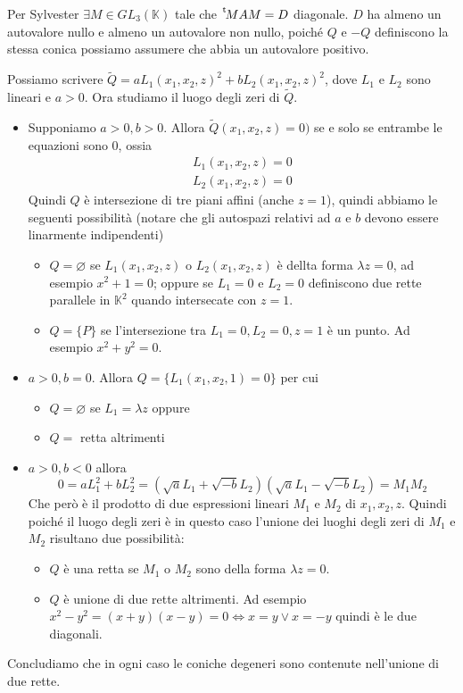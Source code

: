 \documentclass{article}
\newcommand*{\transp}[2][-3mu]{\ensuremath{\mskip1mu\prescript{\smash{\mathrm t\mkern#1}}{}{\mathstrut#2}}}%
\theoremstyle{plain}
\theoremstyle{definition}
\theoremstyle{remark}
\begin{document}
Per Sylvester \(\exists M \in GL_3(\mathbb{K})\) tale che \(\transp{M} A M = D\)
diagonale. \(D\) ha almeno un autovalore nullo e almeno un autovalore non nullo,
poiché \(Q\) e \(-Q\) definiscono la stessa conica possiamo assumere che abbia
un autovalore positivo.

Possiamo scrivere \(\widetilde Q = aL_{1}(x_{1}, x_{2}, z)^2 + bL_{2}(x_{1}, x_{2},
z)^2\), dove \(L_{1}\) e \(L_{2}\) sono lineari e \(a > 0\). Ora studiamo il
luogo degli zeri di \(\widetilde{Q}\).
\begin{itemize}[label = --]
    \item Supponiamo \(a > 0, b > 0\). Allora \(\widetilde{Q}(x_{1}, x_{2}, z) =
        0)\) se e solo se entrambe le equazioni sono \(0\), ossia
        \begin{align*}
            L_{1}(x_{1}, x_{2}, z) = 0 \\
            L_{2}(x_{1}, x_{2}, z) = 0
        \end{align*}
        Quindi \(Q\) è intersezione di tre piani affini (anche \(z = 1\)), quindi abbiamo le
        seguenti possibilità (notare che gli autospazi relativi ad \(a\) e \(b\)
        devono essere linarmente indipendenti)
\begin{itemize}[label = --]
    \item \(Q = \varnothing\) se \(L_{1}(x_{1}, x_{2}, z)\) o \(L_{2}(x_{1},
        x_{2}, z)\) è dellta forma \(\lambda z = 0\), ad esempio \(x^2 + 1 =
        0\); oppure se \(L_{1} = 0\) e \(L_{2}= 0\) definiscono due rette
        parallele in \(\mathbb{K}^2\) quando intersecate con \(z=1\). 
    \item \(Q = \{P\} \) se l'intersezione tra \(L_{1} = 0, L_{2} = 0, z=1\) è
        un punto. Ad esempio \(x^2+y^2 = 0\).
\end{itemize}
    \item \(a > 0, b = 0\). Allora \(Q = \{L_{1}(x_{1}, x_{2}, 1) = 0\} \) per
        cui
\begin{itemize}[label = --]
\item \(Q = \varnothing\) se \(L_{1} = \lambda z\) oppure
\item \(Q =\) retta altrimenti
\end{itemize}
\item \(a > 0, b < 0\) allora
    \[
        0 = aL_{1}^2 + bL_{2}^2 = \left( \sqrt{a}L_{1} + \sqrt{-b}L_{2} \right)
        \left( \sqrt{a}L_{1} - \sqrt{-b}L_{2} \right) = M_{1}M_{2}
    \]
    Che però è il prodotto di due espressioni lineari \(M_{1}\) e \(M_{2}\) di
    \(x_{1}, x_{2}, z\). Quindi poiché il luogo degli zeri è in questo caso
    l'unione dei luoghi degli zeri di \(M_{1}\) e \(M_{2}\) risultano due
    possibilità:
\begin{itemize}[label = --]
    \item \(Q\) è una retta se \(M_{1}\) o \(M_{2}\) sono della forma \(\lambda
        z = 0\). 
    \item \(Q\) è unione di due rette altrimenti. Ad esempio \(x^2- y^2 =
        (x+y)(x-y) = 0 \iff x = y \lor x = -y\) quindi è le due diagonali.
\end{itemize}
\end{itemize}
Concludiamo che in ogni caso le coniche degeneri sono contenute nell'unione di
due rette.
\end{document}
